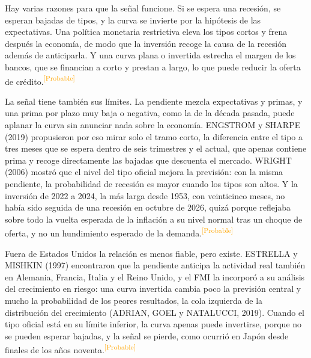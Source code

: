 \documentclass[10pt,a4paper]{article}
\begin{document}
Hay varias razones para que la señal funcione. Si se espera una recesión, se esperan bajadas de tipos, y la curva se invierte por la hipótesis de las expectativas. Una política monetaria restrictiva eleva los tipos cortos y frena después la economía, de modo que la inversión recoge la causa de la recesión además de anticiparla. Y una curva plana o invertida estrecha el margen de los bancos, que se financian a corto y prestan a largo, lo que puede reducir la oferta de crédito.\textcolor{orange}{\textsuperscript{[Probable]}}

La señal tiene también sus límites. La pendiente mezcla expectativas y primas, y una prima por plazo muy baja o negativa, como la de la década pasada, puede aplanar la curva sin anunciar nada sobre la economía. ENGSTROM y SHARPE (2019) propusieron por eso mirar solo el tramo corto, la diferencia entre el tipo a tres meses que se espera dentro de seis trimestres y el actual, que apenas contiene prima y recoge directamente las bajadas que descuenta el mercado. WRIGHT (2006) mostró que el nivel del tipo oficial mejora la previsión: con la misma pendiente, la probabilidad de recesión es mayor cuando los tipos son altos. Y la inversión de 2022 a 2024, la más larga desde 1953, con veinticinco meses, no había sido seguida de una recesión en octubre de 2026, quizá porque reflejaba sobre todo la vuelta esperada de la inflación a su nivel normal tras un choque de oferta, y no un hundimiento esperado de la demanda.\textcolor{orange}{\textsuperscript{[Probable]}}

Fuera de Estados Unidos la relación es menos fiable, pero existe. ESTRELLA y MISHKIN (1997) encontraron que la pendiente anticipa la actividad real también en Alemania, Francia, Italia y el Reino Unido, y el FMI la incorporó a su análisis del crecimiento en riesgo: una curva invertida cambia poco la previsión central y mucho la probabilidad de los peores resultados, la cola izquierda de la distribución del crecimiento (ADRIAN, GOEL y NATALUCCI, 2019). Cuando el tipo oficial está en su límite inferior, la curva apenas puede invertirse, porque no se pueden esperar bajadas, y la señal se pierde, como ocurrió en Japón desde finales de los años noventa.\textcolor{orange}{\textsuperscript{[Probable]}}
\end{document}
